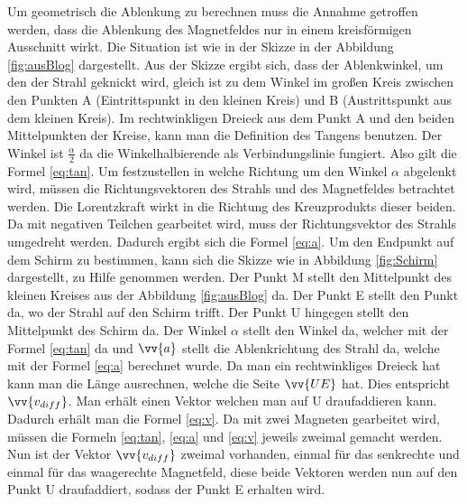Um geometrisch die Ablenkung zu berechnen muss die Annahme getroffen werden, dass die Ablenkung des Magnetfeldes nur in einem kreisförmigen Ausschnitt wirkt.
Die Situation ist wie in der Skizze in der Abbildung \ref{fig:ausBlog} dargestellt.\cite{Blog}
Aus der Skizze ergibt sich, dass der Ablenkwinkel, um den der Strahl geknickt wird, gleich ist zu dem Winkel im großen Kreis zwischen den Punkten A (Eintrittspunkt in den kleinen Kreis) und B (Austrittspunkt aus dem kleinen Kreis).
Im rechtwinkligen Dreieck aus dem Punkt A und den beiden Mittelpunkten der Kreise, kann man die Definition des Tangens benutzen.
Der Winkel ist $\frac{\alpha}{2}$ da die Winkelhalbierende als Verbindungslinie fungiert.
Also gilt die Formel \ref{eq:tan}.
Um festzustellen in welche Richtung um den Winkel $\alpha$ abgelenkt wird, müssen die Richtungsvektoren des Strahls und des Magnetfeldes betrachtet werden.
Die Lorentzkraft wirkt in die Richtung des Kreuzprodukts dieser beiden.
Da mit negativen Teilchen gearbeitet wird, muss der Richtungsvektor des Strahls umgedreht werden. Dadurch ergibt sich die Formel \ref{eq:a}.
Um den Endpunkt auf dem Schirm zu bestimmen, kann sich die Skizze wie in Abbildung \ref{fig:Schirm} dargestellt, zu Hilfe genommen werden.
Der Punkt M stellt den Mittelpunkt des kleinen Kreises aus der Abbildung \ref{fig:ausBlog} da.
Der Punkt E stellt den Punkt da, wo der Strahl auf den Schirm trifft. Der Punkt U hingegen stellt den Mittelpunkt des Schirm da.
Der Winkel $\alpha$ stellt den Winkel da, welcher mit der Formel \ref{eq:tan} da und $\vv{a}$ stellt die Ablenkrichtung des Strahl da, welche mit der Formel \ref{eq:a} berechnet wurde.
Da man ein rechtwinkliges Dreieck hat kann man die Länge ausrechnen, welche die Seite $\vv{UE}$ hat.
Dies entspricht $\vv{v_{diff}}$.
Man erhält einen Vektor welchen man auf U draufaddieren kann.
Dadurch erhält man die Formel \ref{eq:v}.
Da mit zwei Magneten gearbeitet wird, müssen die Formeln \ref{eq:tan}, \ref{eq:a} und \ref{eq:v} jeweils zweimal gemacht werden.
Nun ist der Vektor $\vv{v_{diff}}$ zweimal vorhanden, einmal für das senkrechte und einmal für das waagerechte Magnetfeld, diese beide Vektoren werden nun auf den Punkt U draufaddiert, sodass der Punkt E erhalten wird.
